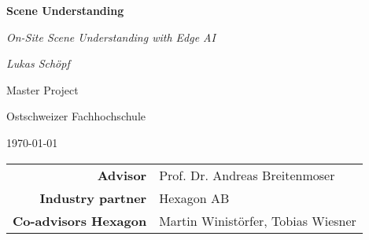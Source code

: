 %
%
%


\begin{titlepage}
    \centering

    {\huge \bfseries \sffamily Scene Understanding \par
     \normalfont\itshape On-Site Scene Understanding with Edge AI \par}
    \vspace{1cm}

    {\large \textsl{Lukas Schöpf}}
    \par
    \vspace{1cm}

    {\textsc Master Project \par}
    {Ostschweizer Fachhochschule \par}
    \today
    \vfill
    

    \vfill

    \begin{tabular}{rl}
        \bfseries\sffamily Advisor              & Prof. Dr. Andreas Breitenmoser \\
        \bfseries\sffamily Industry partner     & Hexagon AB \\
        \bfseries\sffamily Co-advisors Hexagon   & Martin Winistörfer, Tobias Wiesner \\
    \end{tabular}
    \restoregeometry    
\end{titlepage}

